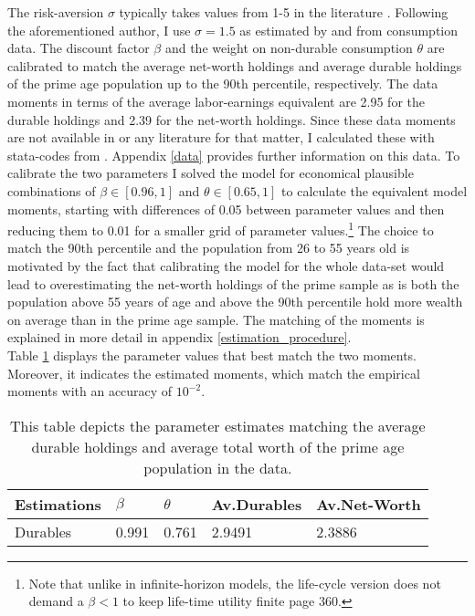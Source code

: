 \documentclass[12pt,a4paper,leqno]{article}
\theoremstyle{definition}
\begin{document}
The risk-aversion $\sigma$ typically takes values from 1-5 in the literature \citep{yang2009}. Following the aforementioned author, I use $\sigma = 1.5$ as estimated by \cite{attanasio1999} and \cite{Gourinchas&Parker2002} from consumption data. The discount factor $\beta$ and the weight on non-durable consumption $\theta$ are calibrated to match the average net-worth holdings and average durable holdings of the prime age population up to the 90th percentile, respectively. The data moments in terms of the average labor-earnings equivalent are 2.95 for the durable holdings and 2.39 for the net-worth  holdings. Since these data moments are not available in \citep{hintermaier2011} or any literature for that matter, I calculated these with stata-codes from \cite{hintermaier2016}. Appendix \ref{data} provides further information on this data. To calibrate the two parameters I solved the model for economical plausible combinations of $\beta \in [0.96,1]$ and $\theta \in [0.65,1]$ to calculate the equivalent model moments, starting with differences of 0.05 between parameter values and then reducing them to 0.01 for a smaller grid of parameter values.\footnote{Note that unlike in infinite-horizon models, the life-cycle version does not demand a $\beta < 1$ to keep life-time utility finite \cite{heer2004dge} page 360.} The choice to match the 90th percentile and the population from 26 to 55 years old is motivated by the fact that calibrating the model for the whole data-set would lead to overestimating the net-worth holdings of the prime sample \textendash as is both the population above 55 years of age and above the 90th percentile hold more wealth on average than in the prime age sample. The matching of the moments is explained in more detail in appendix \ref{estimation_procedure}. \\
Table \ref{estimates} displays the parameter values that best match the two moments. Moreover, it indicates the estimated moments, which match the empirical moments with an accuracy of $10^{-2}$.

\begin{table}[!htbp]
\centering
\caption{This table depicts the parameter estimates matching the average durable holdings and average total worth of the prime age population in the data.}
\label{estimates}
\begin{tabular}{llllll}
\hline
\multicolumn{2}{l}{Estimations} & $\beta$ & $\theta$ & Av.Durables & Av.Net-Worth\\ \hline
\multicolumn{2}{l}{Durables}             & 0.991    & 0.761  & 2.9491 & 2.3886      \\
  
\end{tabular}
\end{table}
\end{document}
